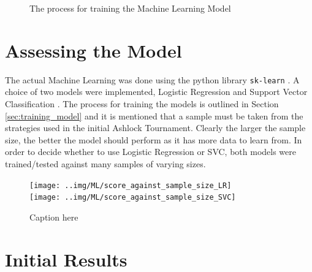 \begin{figure}
    \centering
    \caption{The process for training the Machine Learning Model}
    \label{fig:ml_process}
\end{figure}



\section{Assessing the Model}\label{sec:assessing_model}

The actual Machine Learning was done using the python library \texttt{sk-learn} \cite{scikit-learn}.
A choice of two models were implemented, Logistic Regression \cite{Schmidt2016, Yu2011} and Support Vector Classification \cite{Smola2004, Vandewalle1999}.
The process for training the models is outlined in Section \ref{sec:training_model} and it is mentioned that a sample must be taken from the strategies used in the initial Ashlock Tournament.
Clearly the larger the sample size, the better the model should perform as it has more data to learn from.
In order to decide whether to use Logistic Regression or SVC, both models were trained/tested against many samples of varying sizes.

\begin{figure}[htbp!]
    \centering
    \texttt{[image: ..img/ML/score\_against\_sample\_size\_LR]}\\
    \texttt{[image: ..img/ML/score\_against\_sample\_size\_SVC]}
    \caption{Caption here}
    \label{fig:figure1}
\end{figure}


\section{Initial Results}

